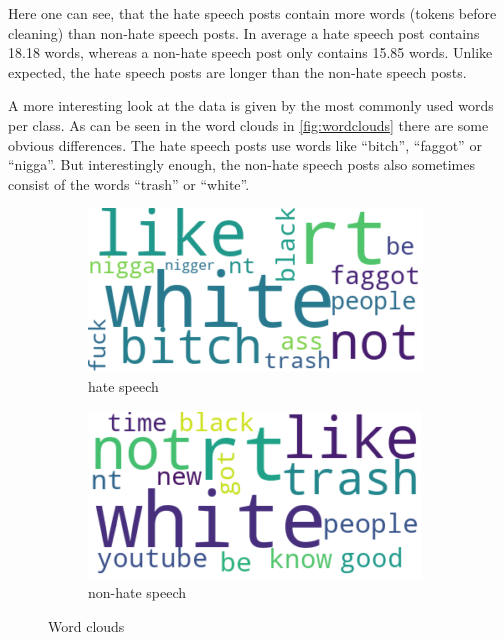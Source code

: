 Here one can see, that the hate speech posts contain more words (tokens before cleaning) than non-hate speech posts. In average a hate speech post contains 18.18 words, whereas a non-hate speech post only contains 15.85 words. Unlike expected, the hate speech posts are longer than the non-hate speech posts.

A more interesting look at the data is given by the most commonly used words per class. As can be seen in the word clouds in \autoref{fig:wordclouds} there are some obvious differences. The hate speech posts use words like \enquote{bitch}, \enquote{faggot} or \enquote{nigga}. But interestingly enough, the non-hate speech posts also sometimes consist of the words \enquote{trash} or \enquote{white}.

\begin{figure}[ht]
    \hfill
    \begin{subfigure}[b]{0.4\textwidth}
        \centering
        \includegraphics[width=\textwidth]{figures/Wordcloud-HateSpeech-tokens.png}
        \caption{hate speech}
    \end{subfigure}
    \hfill
    \begin{subfigure}[b]{0.4\textwidth}
        \centering
        \includegraphics[width=\textwidth]{figures/Wordcloud-Non-HateSpeech-tokens.png}
        \caption{non-hate speech}
    \end{subfigure}
    \hfill
    \caption{Word clouds}
    \label{fig:wordclouds}
\end{figure}

